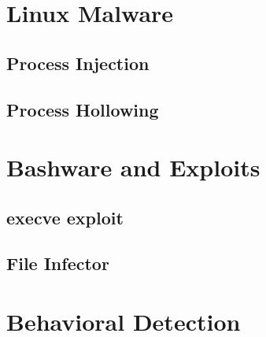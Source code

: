     \section{Linux Malware}
        \subsection{Process Injection}
        \subsection{Process Hollowing}
    \section{Bashware and Exploits}
        \subsection{execve exploit}
        \subsection{File Infector}
    \section{Behavioral Detection}
    